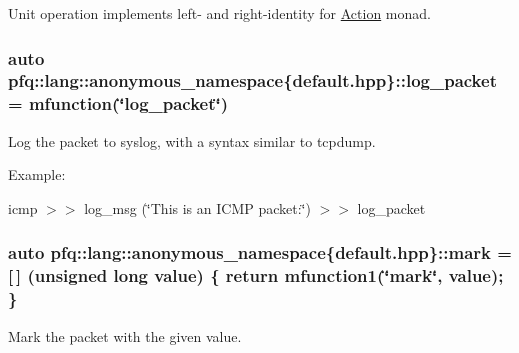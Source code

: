 Unit operation implements left-\/ and right-\/identity for \hyperlink{structpfq_1_1lang_1_1Action}{Action} monad. 

\hypertarget{namespacepfq_1_1lang_1_1anonymous__namespace_02default_8hpp_03_aed6076a98aece625738cbda3689183e2}{
\subsubsection[{log\+\_\+packet}]{\setlength{\rightskip}{0pt plus 5cm}auto pfq\+::lang\+::anonymous\+\_\+namespace\{default.\+hpp\}\+::log\+\_\+packet = {\bf mfunction}(\char`\"{}log\+\_\+packet\char`\"{})}}\label{namespacepfq_1_1lang_1_1anonymous__namespace_02default_8hpp_03_aed6076a98aece625738cbda3689183e2}


Log the packet to syslog, with a syntax similar to tcpdump. 

Example\+:

icmp $>$$>$ log\+\_\+msg (\char`\"{}\+This is an I\+C\+M\+P packet\+:\char`\"{}) $>$$>$ log\+\_\+packet \hypertarget{namespacepfq_1_1lang_1_1anonymous__namespace_02default_8hpp_03_a7b831baeabda070b89ca862a9445a4a8}{
\subsubsection[{mark}]{\setlength{\rightskip}{0pt plus 5cm}auto pfq\+::lang\+::anonymous\+\_\+namespace\{default.\+hpp\}\+::mark = \mbox{[}$\,$\mbox{]} (unsigned long value) \{ return {\bf mfunction1}(\char`\"{}mark\char`\"{}, value); \}}}\label{namespacepfq_1_1lang_1_1anonymous__namespace_02default_8hpp_03_a7b831baeabda070b89ca862a9445a4a8}


Mark the packet with the given value. 


